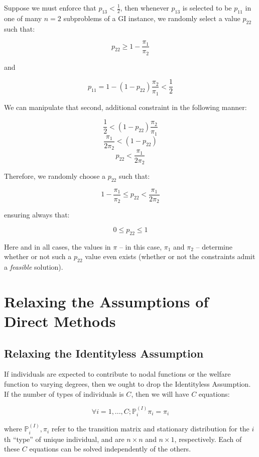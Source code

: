 \documentclass{article}
\begin{document}
Suppose we must enforce that $p_{13} < \frac{1}{2}$, then whenever $p_{13}$ is selected to be $p_{11}$ in one of many $n=2$ subproblems of a GI instance, we randomly select a value $p_{22}$ such that:

\[
p_{22} \geq 1 - \frac{\pi_1}{\pi_2}
\]

and

\[
p_{11} = 1 - (1-p_{22})\frac{\pi_2}{\pi_1} < \frac{1}{2}
\]

We can manipulate that second, additional constraint in the following manner:

\[
\frac{1}{2} < (1-p_{22})\frac{\pi_2}{\pi_1}
\]\[
\frac{\pi_1}{2\pi_2} < (1-p_{22})
\]\[
p_{22} < \frac{\pi_1}{2\pi_2}
\]

Therefore, we randomly choose a $p_{22}$ such that:

\[
1 - \frac{\pi_1}{\pi_2} \leq p_{22} < \frac{\pi_1}{2\pi_2}
\]

ensuring always that:

\[
0 \leq p_{22} \leq 1
\]

Here and in all cases, the values in $\pi$ -- in this case, $\pi_1$ and $\pi_2$ -- determine whether or not such a $p_{22}$ value even exists (whether or not the constraints admit a \textit{feasible} solution).

\section{Relaxing the Assumptions of Direct Methods}
\subsection{Relaxing the Identityless Assumption}
If individuals are expected to contribute to nodal functions or the welfare function to varying degrees, then we ought to drop the Identityless Assumption. If the number of types of individuals is $C$, then we will have $C$ equations:

\begin{equation}\label{eq:4}
    \forall i=1,...,C ; \mathbb{P}^{(I)}_i\pi_i = \pi_i
\end{equation}

where $\mathbb{P}^{(I)}_i, \pi_i$ refer to the transition matrix and stationary distribution for the $i$th ``type'' of unique individual, and are $n \times n$ and $n \times 1$, respectively. Each of these $C$ equations can be solved independently of the others.
\end{document}
